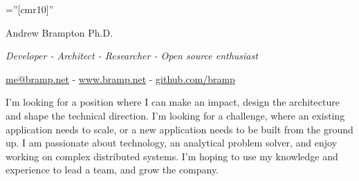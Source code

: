 \documentclass[letterpaper,10pt]{article}
\newcounter{dateone}
\newcounter{datetwo}
\newcommand{\difftoday}[3]{%
      \setmydatenumber{dateone}{\the\year}{\the\month}{\the\day}%
      \setmydatenumber{datetwo}{#1}{#2}{#3}%
      \addtocounter{datetwo}{-\thedateone}%
      \the\numexpr-\thedatetwo/365\relax\space years
}
\begin{document}
\pagestyle{empty} %

\font\fb=''[cmr10]'' %

\par{\centering
	{\Huge Andrew Brampton Ph.D.}

	{\it Developer - Architect - Researcher - Open source enthusiast}

	\href{mailto:me@bramp.net}{me@bramp.net} - \href{https://bramp.net}{www.bramp.net} - \href{https://github.com/bramp}{github.com/bramp}
\par}

I'm looking for a position where I can make an impact, design the architecture and shape the technical direction. I'm looking for a challenge, where an existing
application needs to scale, or a new application needs to be built from the ground up. I am passionate about technology, an analytical problem solver, and enjoy
working on complex distributed systems. I'm hoping to use my knowledge and experience to lead a team, and grow the company.


\end{document}
